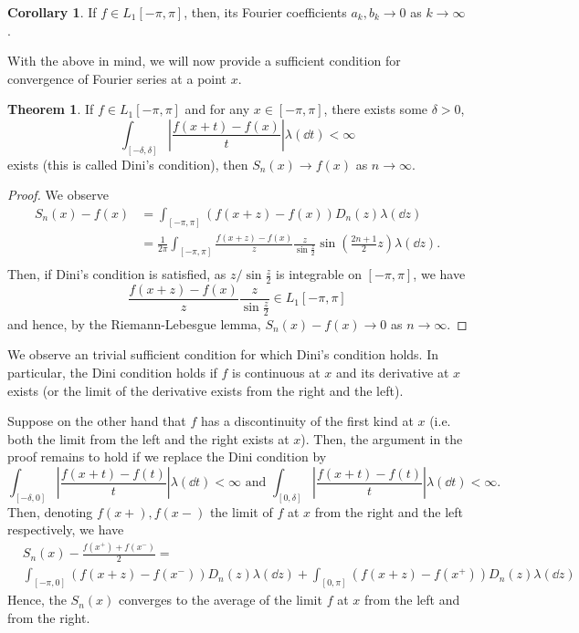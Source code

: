 \documentclass[]{article}
\theoremstyle{definition}
\newtheorem{theorem}{Theorem}
\newtheorem{corollary}{Corollary}[theorem]
\theoremstyle{definition}
\begin{document}
\begin{corollary}
  If \(f \in L_1[-\pi, \pi]\), then, its Fourier coefficients \(a_k, b_k \to 0\) 
  as \(k \to \infty\).
\end{corollary}

With the above in mind, we will now provide a sufficient condition for convergence of 
Fourier series at a point \(x\).

\begin{theorem}
  If \(f \in L_1[-\pi, \pi]\) and for any \(x \in [-\pi, \pi]\), there exists some \(\delta > 0\), 
  \[\int_{[-\delta, \delta]} \left|\frac{f(x + t) - f(x)}{t}\right| \lambda(\dd t) < \infty\]
  exists (this is called Dini's condition), then \(S_n(x) \to f(x)\) as \(n \to \infty\).
\end{theorem}
\begin{proof}
  We observe
  \[\begin{split}
    S_n(x) - f(x) & = \int_{[-\pi, \pi]} (f(x + z) - f(x)) D_n(z) \lambda(\dd z)\\
    & = \frac{1}{2\pi}\int_{[-\pi, \pi]} \frac{f(x + z) - f(x)}{z} 
      \frac{z}{\sin \frac{z}{2}} \sin \left(\frac{2 n + 1}{2}z\right)\lambda(\dd z).\\
  \end{split}\]
  Then, if Dini's condition is satisfied, as \(z / \sin \frac{z}{2}\) is integrable on 
  \([-\pi, \pi]\), we have 
  \[\frac{f(x + z) - f(x)}{z} \frac{z}{\sin \frac{z}{2}} \in L_1[-\pi, \pi]\]
  and hence, by the Riemann-Lebesgue lemma, \(S_n(x) - f(x) \to 0\) as 
  \(n \to \infty\).
\end{proof}

We observe an trivial sufficient condition for which Dini's condition holds. 
In particular, the Dini condition holds if \(f\) is continuous at \(x\) and its derivative at 
\(x\) exists (or the limit of the derivative exists from the right and the left).

Suppose on the other hand that \(f\) has a discontinuity of the first kind at 
\(x\) (i.e. both the limit from the left and the right exists at \(x\)). Then, 
the argument in the proof remains to hold if we replace the Dini condition by 
\[\int_{[-\delta, 0] } \left|\frac{f(x + t) - f(t)}{t}\right| \lambda(\dd t) < \infty
\text{ and } 
\int_{[0, \delta] } \left|\frac{f(x + t) - f(t)}{t}\right| \lambda(\dd t) < \infty.\]
Then, denoting \(f(x +), f(x -)\) the limit of \(f\) at \(x\) from the right and the 
left respectively, we have
\[\begin{split}
  &S_n(x) - \frac{f(x^+) + f(x^-)}{2} =\\ 
  &\int_{[-\pi, 0]} (f(x + z) - f(x^-)) D_n(z) \lambda(\dd z)
 + \int_{[0, \pi]} (f(x + z) - f(x^+)) D_n(z) \lambda(\dd z)
 \end{split}\]
Hence, the \(S_n(x)\) converges to the average of the limit \(f\) at \(x\) from 
the left and from the right.
\end{document}
